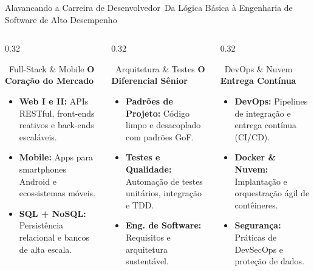 
\begin{frame}{Alavancando a Carreira de Desenvolvedor}{\faRocket\ Da Lógica Básica à Engenharia de Software de Alto Desempenho}
  \begin{columns}[t]
    \begin{column}{0.32\textwidth}
      \begin{bluecard}{\faCode\ Full-Stack \& Mobile}
        \tiny
        \textbf{O Coração do Mercado}
        \begin{itemize}\setlength{\itemsep}{0.15em}
          \item \textbf{Web I e II:} APIs RESTful, front-ends reativos e back-ends escaláveis.
          \item \textbf{Mobile:} Apps para smartphones Android e ecossistemas móveis.
          \item \textbf{SQL + NoSQL:} Persistência relacional e bancos de alta escala.
        \end{itemize}
      \end{bluecard}
    \end{column}
    
    \begin{column}{0.32\textwidth}
      \begin{purplecard}{\faDraftingCompass\ Arquitetura \& Testes}
        \tiny
        \textbf{O Diferencial Sênior}
        \begin{itemize}\setlength{\itemsep}{0.15em}
          \item \textbf{Padrões de Projeto:} Código limpo e desacoplado com padrões GoF.
          \item \textbf{Testes e Qualidade:} Automação de testes unitários, integração e TDD.
          \item \textbf{Eng. de Software:} Requisitos e arquitetura sustentável.
        \end{itemize}
      \end{purplecard}
    \end{column}
    
    \begin{column}{0.32\textwidth}
      \begin{greencard}{\faCloud\ DevOps \& Nuvem}
        \tiny
        \textbf{Entrega Contínua}
        \begin{itemize}\setlength{\itemsep}{0.15em}
          \item \textbf{DevOps:} Pipelines de integração e entrega contínua (CI/CD).
          \item \textbf{Docker \& Nuvem:} Implantação e orquestração ágil de contêineres.
          \item \textbf{Segurança:} Práticas de DevSecOps e proteção de dados.
        \end{itemize}
      \end{greencard}
    \end{column}
  \end{columns}
  

\end{frame}

